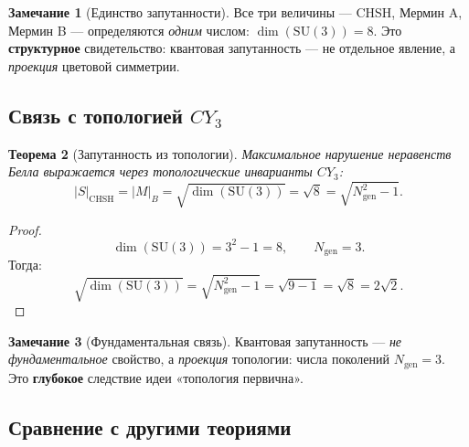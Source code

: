 \documentclass[11pt,a4paper]{article}
\newcommand{\SU}{\mathrm{SU}}
\newcommand{\CY}{CY_3}
\newtheorem{theorem}{Теорема}[section]
\theoremstyle{definition}
\newtheorem{remark}[theorem]{Замечание}
\begin{document}
\begin{remark}[Единство запутанности]
\label{rem:entanglement-unity}
Все три величины — CHSH, Мермин A, Мермин B — определяются 
\emph{одним} числом: $\dim(\SU(3)) = 8$. Это 
\textbf{структурное} свидетельство: квантовая запутанность — 
не отдельное явление, а \emph{проекция} цветовой симметрии.
\end{remark}

\subsection{Связь с топологией $\CY$}
\label{subsec:entanglement-topology}

\begin{theorem}[Запутанность из топологии]
\label{thm:entanglement-topology}
Максимальное нарушение неравенств Белла выражается через 
топологические инварианты $\CY$:
\begin{equation}
    \boxed{
    |S|_{\text{CHSH}} = |M|_B = \sqrt{\dim(\SU(3))} 
    = \sqrt{8} = \sqrt{N_{\text{gen}}^2 - 1}.
    }
    \label{eq:entanglement-topology}
\end{equation}
\end{theorem}

\begin{proof}
\begin{equation}
    \dim(\SU(3)) = 3^2 - 1 = 8, \qquad 
    N_{\text{gen}} = 3.
\end{equation}
Тогда:
\begin{equation}
    \sqrt{\dim(\SU(3))} = \sqrt{N_{\text{gen}}^2 - 1} 
    = \sqrt{9 - 1} = \sqrt{8} = 2\sqrt{2}.
\end{equation}
\end{proof}

\begin{remark}[Фундаментальная связь]
\label{rem:entanglement-fundamental}
Квантовая запутанность — \emph{не фундаментальное} свойство, 
а \emph{проекция} топологии: числа поколений $N_{\text{gen}} = 3$. 
Это \textbf{глубокое} следствие идеи «топология первична».
\end{remark}

\subsection{Сравнение с другими теориями}
\label{subsec:entanglement-comparison}
\end{document}
